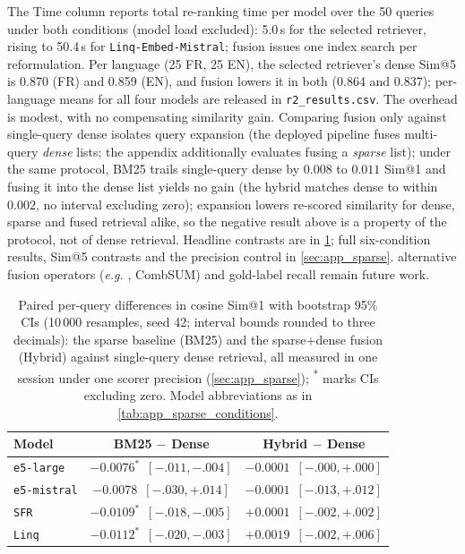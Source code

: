 \documentclass[11pt]{article}
\newcommand{\eg}{\textit{e.g. }}
\begin{document}
The Time column reports total re-ranking time per model over the 50 queries under both conditions (model load excluded): 5.0\,s for the selected retriever, rising to 50.4\,s for \texttt{Linq-Embed-Mistral}; fusion issues one index search per reformulation. Per language (25 FR, 25 EN), the selected retriever's dense Sim@5 is 0.870 (FR) and 0.859 (EN), and fusion lowers it in both (0.864 and 0.837); per-language means for all four models are released in \texttt{r2\_results.csv}. The overhead is modest, with no compensating similarity gain. Comparing fusion only against single-query dense isolates query expansion (the deployed pipeline fuses multi-query \emph{dense} lists; the appendix additionally evaluates fusing a \emph{sparse} list); under the same protocol, BM25 trails single-query dense by \(0.008\) to \(0.011\) Sim@1 and fusing it into the dense list yields no gain (the hybrid matches dense to within \(0.002\), no interval excluding zero); expansion lowers re-scored similarity for dense, sparse and fused retrieval alike, so the negative result above is a property of the protocol, not of dense retrieval. Headline contrasts are in \cref{tab:baseline_contrasts}; full six-condition results, Sim@5 contrasts and the precision control in \cref{sec:app_sparse}. alternative fusion operators (\eg, CombSUM) and gold-label recall remain future work.

\begin{table}[t]
    \centering
    \scriptsize
    \setlength{\tabcolsep}{3.2pt}
    \caption{Paired per-query differences in cosine Sim@1 with bootstrap 95\% CIs (10\,000 resamples, seed 42; interval bounds rounded to three decimals): the sparse baseline (BM25) and the sparse+dense fusion (Hybrid) against single-query dense retrieval, all measured in one session under one scorer precision (\cref{sec:app_sparse}); \textsuperscript{*} marks CIs excluding zero. Model abbreviations as in \cref{tab:app_sparse_conditions}.}
    \label{tab:baseline_contrasts}
    \begin{tabular}{|l|cc|}
        \hline
        Model & BM25 $-$ Dense & Hybrid $-$ Dense \\
        \hline
        \texttt{e5-large} & $-0.0076^{*}$\ $[-.011,-.004]$ & $-0.0001$\ $[-.000,+.000]$ \\
        \texttt{e5-mistral} & $-0.0078$\ $[-.030,+.014]$ & $-0.0001$\ $[-.013,+.012]$ \\
        \texttt{SFR} & $-0.0109^{*}$\ $[-.018,-.005]$ & $+0.0001$\ $[-.002,+.002]$ \\
        \texttt{Linq} & $-0.0112^{*}$\ $[-.020,-.003]$ & $+0.0019$\ $[-.002,+.006]$ \\
        \hline
    \end{tabular}
\end{table}
\end{document}
